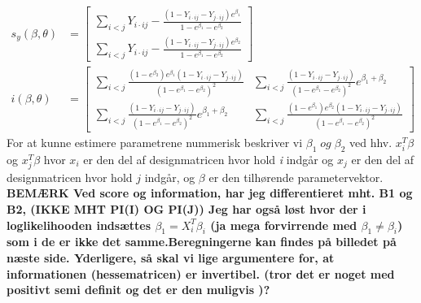 \documentclass[11pt,a4paper]{article}
\begin{document}
\begin{align}
s_y(\beta,\theta)&=\begin{bmatrix}\sum_{i<j}Y_{i\cdot ij}-\frac{(1-Y_{i\cdot ij}-Y_{j\cdot ij})e^{\beta_1}}{1-e^{\beta_1}-e^{\beta_2}}\\\sum_{i<j}Y_{i\cdot ij}-\frac{(1-Y_{i\cdot ij}-Y_{j\cdot ij})e^{\beta_2}}{1-e^{\beta_1}-e^{\beta_2}}
\end{bmatrix}\\
i(\beta,\theta)
&=\begin{bmatrix}\sum_{i<j}\frac{(1-e^{\beta_2})e^{\beta_1}(1-Y_{i\cdot ij}-Y_{j\cdot ij})}{(1-e^{\beta_1}-e^{\beta_2})^2}
&\sum_{i<j}\frac{(1-Y_{i\cdot ij}-Y_{j\cdot ij})}{(1-e^{\beta_1}-e^{\beta_2})^2}e^{\beta_1+\beta_2}
\\
\sum_{i<j}\frac{(1-Y_{i\cdot ij}-Y_{j\cdot ij})}{(1-e^{\beta_1}-e^{\beta_2})^2}e^{\beta_1+\beta_2}
&\sum_{i<j}\frac{(1-e^{\beta_1})e^{\beta_2}(1-Y_{i\cdot ij}-Y_{j\cdot ij})}{(1-e^{\beta_1}-e^{\beta_2})^2}\end{bmatrix}
\end{align}
For at kunne estimere parametrene nummerisk beskriver vi $\beta_1 \; og \; \beta_2$ ved hhv. $x_i^T\beta$ og $x_{j}^T\beta$ hvor $x_i$ er den del af designmatricen hvor hold \textit{i} indgår og $x_{j}$ er den del af designmatricen hvor hold $j$ indgår, og $\beta$ er den tilhørende parametervektor. 
\newpage
\textbf{BEMÆRK Ved score og information, har jeg differentieret mht. B1 og B2, (IKKE MHT PI(I) OG PI(J)) Jeg har også løst hvor der i loglikelihooden indsættes $\beta_1=X_i^T\beta_i$ (ja mega forvirrende med $\beta_1\neq \beta_i$) som i de er ikke det samme.Beregningerne kan findes på billedet på næste side.
Yderligere, så skal vi lige argumentere for, at informationen (hessematricen) er invertibel. (tror det er noget med positivt semi definit og det er den muligvis )?}
\end{document}
